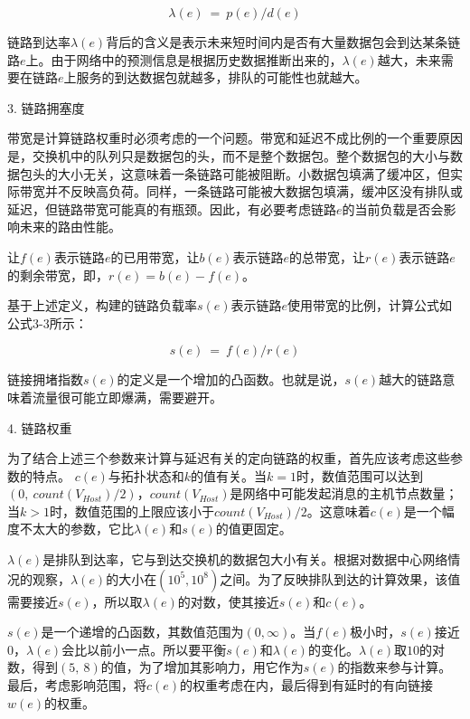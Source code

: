 \begin{equation} \label{link arrival rate}
    \lambda(e)\ =\ p(e)/d(e)
\end{equation}

链路到达率$\lambda(e)$背后的含义是表示未来短时间内是否有大量数据包会到达某条链路$e$上。由于网络中的预测信息是根据历史数据推断出来的，$\lambda(e)$越大，未来需要在链路$e$上服务的到达数据包就越多，排队的可能性也就越大。

3. 链路拥塞度

带宽是计算链路权重时必须考虑的一个问题。带宽和延迟不成比例的一个重要原因是，交换机中的队列只是数据包的头，而不是整个数据包。整个数据包的大小与数据包头的大小无关，这意味着一条链路可能被阻断。小数据包填满了缓冲区，但实际带宽并不反映高负荷。同样，一条链路可能被大数据包填满，缓冲区没有排队或延迟，但链路带宽可能真的有瓶颈。因此，有必要考虑链路$e$的当前负载是否会影响未来的路由性能。

让$f(e)$表示链路$e$的已用带宽，让$b(e)$表示链路$e$的总带宽，让$r(e)$表示链路$e$的剩余带宽，即，$r(e)=b(e)-f(e)$。

基于上述定义，构建的链路负载率$s(e)$表示链路$e$使用带宽的比例，计算公式如公式3-3所示：

\begin{equation} \label{link congestion}
    s(e)\ =\ f(e)/r(e)
\end{equation}

链接拥堵指数$s(e)$的定义是一个增加的凸函数。也就是说，$s(e)$越大的链路意味着流量很可能立即爆满，需要避开。

4. 链路权重

为了结合上述三个参数来计算与延迟有关的定向链路的权重，首先应该考虑这些参数的特点。
$c(e)$与拓扑状态和$k$的值有关。当$k=1$时，数值范围可以达到$(0,\ count(V_{Host})/2)，count(V_{Host})$是网络中可能发起消息的主机节点数量；当$k>1$时，数值范围的上限应该小于$count(V_{Host})/2$。这意味着$c(e)$是一个幅度不太大的参数，它比$\lambda(e)$和$s(e)$的值更固定。

$\lambda(e)$是排队到达率，它与到达交换机的数据包大小有关。根据对数据中心网络情况的观察，$\lambda(e)$的大小在$({10}^5,{10}^8)$之间。为了反映排队到达的计算效果，该值需要接近$s(e)$，所以取$\lambda(e)$的对数，使其接近$s(e)$和$c(e)$。

$s(e)$是一个递增的凸函数，其数值范围为$\left(0,\infty\right)$。当$f(e)$极小时，$s(e)$接近0，$\lambda(e)$会比以前小一点。所以要平衡$s(e)$和$\lambda(e)$的变化。$\lambda(e)$取$10$的对数，得到$\left(5,\ 8\right)$的值，为了增加其影响力，用它作为$s(e)$的指数来参与计算。最后，考虑影响范围，将$c(e)$的权重考虑在内，最后得到有延时的有向链接$w(e)$的权重。

